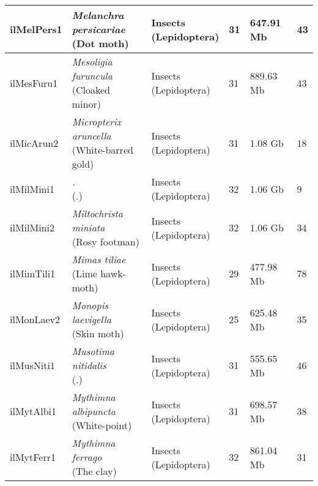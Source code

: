 \begin{centering}
\begin{longtable}{l|l|l|l|l|l}
ilMelPers1 & \makecell[{l}]{\textit{Melanchra persicariae} \\ (Dot moth)} & \makecell[{l}]{Insects \\ (Lepidoptera)} & 31 & 647.91 Mb & 43  \\ \hline
ilMesFuru1 & \makecell[{l}]{\textit{Mesoligia furuncula} \\ (Cloaked minor)} & \makecell[{l}]{Insects \\ (Lepidoptera)} & 31 & 889.63 Mb & 43  \\ \hline
ilMicArun2 & \makecell[{l}]{\textit{Micropterix aruncella} \\ (White-barred gold)} & \makecell[{l}]{Insects \\ (Lepidoptera)} & 31 & 1.08 Gb & 18  \\ \hline
ilMilMini1 & \makecell[{l}]{\textit{.} \\ (.)} & \makecell[{l}]{Insects \\ (Lepidoptera)} & 32 & 1.06 Gb & 9  \\ \hline
ilMilMini2 & \makecell[{l}]{\textit{Miltochrista miniata} \\ (Rosy footman)} & \makecell[{l}]{Insects \\ (Lepidoptera)} & 32 & 1.06 Gb & 34  \\ \hline
ilMimTili1 & \makecell[{l}]{\textit{Mimas tiliae} \\ (Lime hawk-moth)} & \makecell[{l}]{Insects \\ (Lepidoptera)} & 29 & 477.98 Mb & 78  \\ \hline
ilMonLaev2 & \makecell[{l}]{\textit{Monopis laevigella} \\ (Skin moth)} & \makecell[{l}]{Insects \\ (Lepidoptera)} & 25 & 625.48 Mb & 35  \\ \hline
ilMusNiti1 & \makecell[{l}]{\textit{Musotima nitidalis} \\ (.)} & \makecell[{l}]{Insects \\ (Lepidoptera)} & 31 & 555.65 Mb & 46  \\ \hline
ilMytAlbi1 & \makecell[{l}]{\textit{Mythimna albipuncta} \\ (White-point)} & \makecell[{l}]{Insects \\ (Lepidoptera)} & 31 & 698.57 Mb & 38  \\ \hline
ilMytFerr1 & \makecell[{l}]{\textit{Mythimna ferrago} \\ (The clay)} & \makecell[{l}]{Insects \\ (Lepidoptera)} & 32 & 861.04 Mb & 31  \\ \hline

\end{longtable}
\end{centering}
